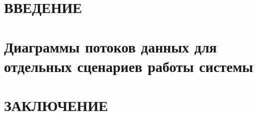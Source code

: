 \documentclass[
    a4paper,
    14pt,
    twoside,
]{extarticle}
\begin{document}

\setcounter{page}{2}

\tableofcontents

\newpage
\section*{\MakeUppercase{Введение}}\label{sec:introduction}


\newpage
\section{Диаграммы потоков данных для отдельных сценариев работы системы}


\newpage
\section*{\MakeUppercase{Заключение}}\label{sec:conclusion}

\end{document}
